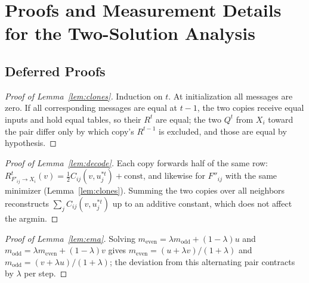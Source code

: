 \documentclass[letterpaper]{article} %
\theoremstyle{definition}
\theoremstyle{remark}
\begin{document}

\section{Proofs and Measurement Details for the Two-Solution Analysis}
\label{app:tworoutes}

\subsection{Deferred Proofs}

\begin{proof}[Proof of Lemma~\ref{lem:clones}]
Induction on $t$.  At initialization all messages are zero.  If all
corresponding messages are equal at $t-1$, the two copies receive equal
inputs and hold equal tables, so their $R^{t}$ are equal; the two $Q^{t}$
from $X_i$ toward the pair differ only by which copy's $R^{t-1}$ is
excluded, and those are equal by hypothesis.
\end{proof}

\begin{proof}[Proof of Lemma~\ref{lem:decode}]
Each copy forwards half of the same row:
$R^{t}_{F'_{ij}\to X_i}(v) = \tfrac12 C_{ij}(v, u^{*t}_j) +
\text{const}$, and likewise for $F''_{ij}$ with the same minimizer
(Lemma~\ref{lem:clones}).  Summing the two copies over all neighbors
reconstructs $\sum_j C_{ij}(v, u^{*t}_j)$ up to an additive constant,
which does not affect the argmin.
\end{proof}

\begin{proof}[Proof of Lemma~\ref{lem:ema}]
Solving $m_{\mathrm{even}} = \lambda m_{\mathrm{odd}} + (1-\lambda)u$ and
$m_{\mathrm{odd}} = \lambda m_{\mathrm{even}} + (1-\lambda)v$ gives
$m_{\mathrm{even}} = (u+\lambda v)/(1+\lambda)$ and
$m_{\mathrm{odd}} = (v+\lambda u)/(1+\lambda)$; the deviation from this
alternating pair contracts by $\lambda$ per step.
\end{proof}
\end{document}
